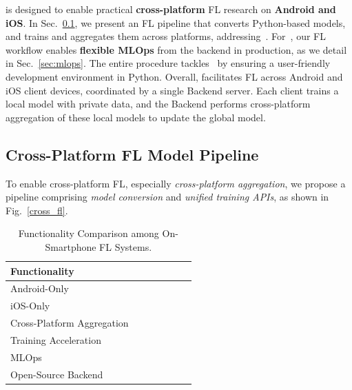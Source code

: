 \documentclass[conference]{IEEEtran}
\begin{document}
\FedKit{} is designed to enable practical \textbf{cross-platform} FL research on
\textbf{Android and iOS}.
In Sec.~\ref{sec:pipeline},
we present an FL pipeline that converts Python-based models,
and trains and aggregates them across platforms,
addressing~\challa{}.
For~\challb{},
our FL workflow enables \textbf{flexible MLOps} from the backend in production,
as we detail in Sec.~\ref{sec:mlops}.
The entire procedure tackles~\challc{} by
ensuring a user-friendly development environment in Python.
Overall,
\FedKit{} facilitates FL across Android and iOS client devices,
coordinated by a single Backend server.
Each client trains a local model with private data,
and the Backend performs cross-platform aggregation of these local models to
update the global model.

\subsection{Cross-Platform FL Model Pipeline}
\label{sec:pipeline}

To enable cross-platform FL,
especially \textit{cross-platform aggregation},
we propose a pipeline comprising
\textit{model conversion} and
\textit{unified training APIs},
as shown in Fig.~\ref{cross_fl}.

\begin{table}
    \centering
    \newcommand{\Ys}{\ding{51}}
    \newcommand{\No}{\ding{55}}
\begin{tabular}{lcccccc}
Functionality               & \cite{he2020fedml}
                                    & \cite{madrigal2023project}
                                            & \cite{mathur2021ondevice}
                                                    & \cite{hall2021syft}
                                                            & \FedKit{}\\
\hline
Android-Only                & \Ys   & \Ys   & \Ys   & \Ys   & \Ys   \\
iOS-Only                    & \No   & \No   & \Ys   & \Ys   & \Ys   \\
Cross-Platform Aggregation  & \No   & \No   & \No   & \Ys   & \Ys   \\\hline
Training Acceleration       & \Ys   & \Ys   & \Ys   & \No   & \Ys   \\
MLOps                       & \Ys   & \Ys   & \No   & \No   & \Ys   \\
Open-Source Backend         & \No   & \No   & \Ys   & \Ys   & \Ys   \\
\end{tabular}
\caption{Functionality Comparison among On-Smartphone FL Systems.}
\label{tbl:fn-systems}
\end{table}
\end{document}
